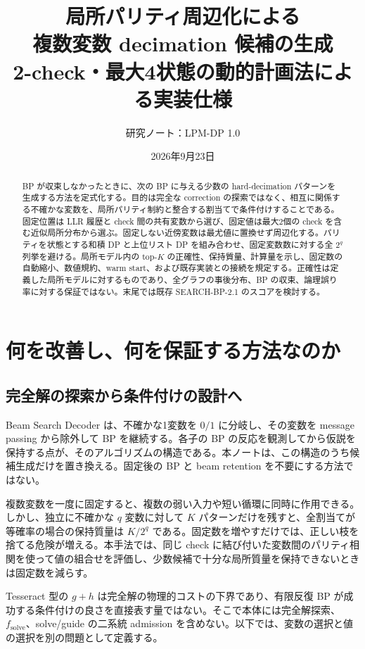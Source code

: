 \documentclass[a4paper,11pt]{ltjsarticle}
\title{局所パリティ周辺化による\\複数変数 decimation 候補の生成\\[3mm]\large 2-check・最大4状態の動的計画法による実装仕様}
\author{研究ノート：LPM-DP 1.0}
\date{2026年9月23日}
\numberwithin{equation}{section}
\theoremstyle{definition}
\begin{document}
\maketitle
\thispagestyle{plain}
\begin{abstract}
BP が収束しなかったときに、次の BP に与える少数の hard-decimation パターンを生成する方法を定式化する。目的は完全な correction の探索ではなく、相互に関係する不確かな変数を、局所パリティ制約と整合する割当てで条件付けすることである。固定位置は LLR 履歴と check 間の共有変数から選び、固定値は最大2個の check を含む近似局所分布から選ぶ。固定しない近傍変数は最尤値に置換せず周辺化する。パリティを状態とする和積 DP と上位リスト DP を組み合わせ、固定変数数に対する全 $2^q$ 列挙を避ける。局所モデル内の top-$K$ の正確性、保持質量、計算量を示し、固定数の自動縮小、数値規約、warm start、および既存実装との接続を規定する。正確性は定義した局所モデルに対するものであり、全グラフの事後分布、BP の収束、論理誤り率に対する保証ではない。末尾では既存 SEARCH-BP-2.1 のスコアを検討する。
\end{abstract}
{\setlength{\parskip}{0pt}\tableofcontents}
\newpage

\section{何を改善し、何を保証する方法なのか}
\subsection{完全解の探索から条件付けの設計へ}
Beam Search Decoder は、不確かな1変数を $0/1$ に分岐し、その変数を message passing から除外して BP を継続する。各子の BP の反応を観測してから仮説を保持する点が、そのアルゴリズムの構造である\cite{beam}。本ノートは、この構造のうち候補生成だけを置き換える。固定後の BP と beam retention を不要にする方法ではない。

複数変数を一度に固定すると、複数の弱い入力や短い循環に同時に作用できる。しかし、独立に不確かな $q$ 変数に対して $K$ パターンだけを残すと、全割当てが等確率の場合の保持質量は $K/2^q$ である。固定数を増やすだけでは、正しい枝を捨てる危険が増える。本手法では、同じ check に結び付いた変数間のパリティ相関を使って値の組合せを評価し、少数候補で十分な局所質量を保持できないときは固定数を減らす。

Tesseract 型の $g+h$ は完全解の物理的コストの下界であり、有限反復 BP が成功する条件付けの良さを直接表す量ではない\cite{tesseract,dtd}。そこで本体には完全解探索、$f_{\mathrm{solve}}$、solve/guide の二系統 admission を含めない。以下では、変数の選択と値の選択を別の問題として定義する。
\end{document}

